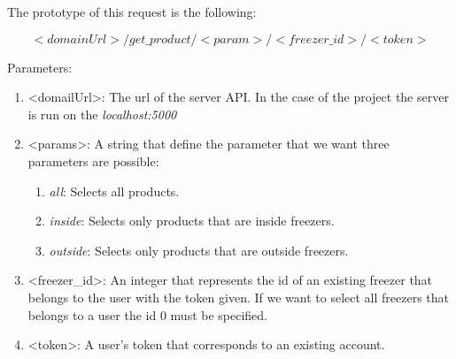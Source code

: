 The prototype of this request is the following:

$$<domainUrl>/get\_product/<param>/<freezer\_id>/<token>$$

Parameters:
\begin{enumerate}
\item <domailUrl>: The url of the server API. In the case of the project the server is run on the \textit{localhost:5000}
\item <params>: A string that define the parameter that we want three parameters are possible:
\begin{enumerate}
\item \textit{all}: Selects all products.
\item \textit{inside}: Selects only products that are inside freezers.
\item \textit{outside}: Selects only products that are outside freezers.
\end{enumerate}
\item <freezer\_id>: An integer that represents the id of an existing freezer that belongs to the user with the token given. If we want to select all freezers that belongs to a user the id 0 must be specified.
\item <token>: A user's token that corresponds to an existing account.
\end{enumerate}


